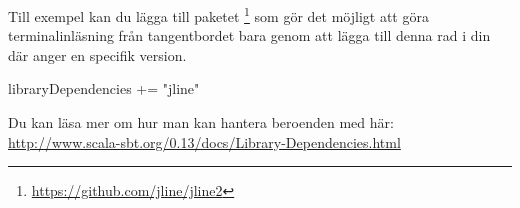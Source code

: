 Till exempel kan du lägga till paketet \footnote{\url{https://github.com/jline/jline2}} som gör det möjligt att göra terminalinläsning från tangentbordet bara genom att lägga till denna rad i din  där  anger en specifik version.

\begin{Code}
libraryDependencies += "jline" %
\end{Code}

Du kan läsa mer om hur man kan hantera beroenden med \sbt här: \\ \url{http://www.scala-sbt.org/0.13/docs/Library-Dependencies.html}

